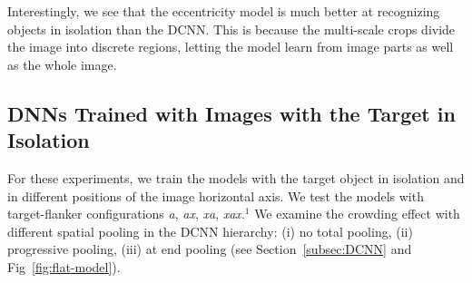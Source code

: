 \documentclass{article}
\begin{document}
Interestingly, we see that the eccentricity model is much better at recognizing objects in isolation than the DCNN. This is because the multi-scale crops divide the image into discrete regions, letting the model learn from image parts as well as the whole image. 

\subsection{DNNs Trained with Images with the Target in Isolation}

For these experiments, we train the models with the target object in isolation and in different positions of the image horizontal axis. We test the models with target-flanker configurations \emph{a}, \emph{ax}, \emph{xa}, \emph{xax}.{\footnotesize{$^1$}}
We examine the crowding effect with different spatial pooling in the DCNN hierarchy: (i) no total pooling, (ii) progressive pooling, (iii) at end pooling (see Section~\ref{subsec:DCNN} and Fig~\ref{fig:flat-model}).
\end{document}
